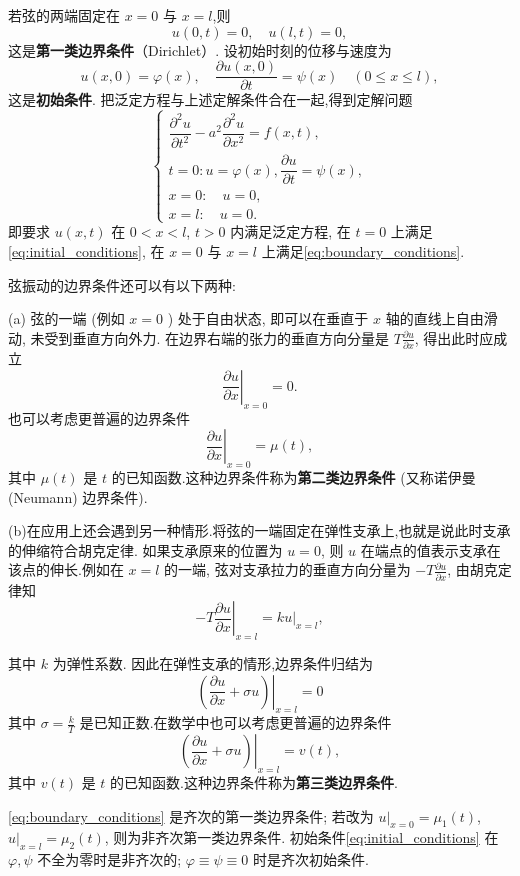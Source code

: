 若弦的两端固定在 $x=0$ 与 $x=l$,则
\begin{equation}
    u(0, t)=0, \quad u(l, t)=0,
    \label{eq:boundary_conditions}
\end{equation}
这是\textbf{第一类边界条件}（Dirichlet）.
设初始时刻的位移与速度为
\begin{equation}
    u(x, 0)=\varphi(x), \quad \frac{\partial u(x, 0)}{\partial t}=\psi(x) \quad(0 \leqslant x \leqslant l),
    \label{eq:initial_conditions}
\end{equation}
这是\textbf{初始条件}.
把泛定方程与上述定解条件合在一起,得到定解问题
$$
\left\{\begin{array}{l}
	\dfrac{\partial^2 u}{\partial t^2}-a^2 \dfrac{\partial^2 u}{\partial x^2}=f(x, t), \\
	t=0: u=\varphi(x), \dfrac{\partial u}{\partial t}=\psi(x), \\
	x=0: \quad u=0, \\
	x=l: \quad u=0 .
\end{array}\right.
$$
即要求 $u(x,t)$ 在 $0<x<l$, $t>0$ 内满足泛定方程,
在 $t=0$ 上满足\eqref{eq:initial_conditions},
在 $x=0$ 与 $x=l$ 上满足\eqref{eq:boundary_conditions}.

弦振动的边界条件还可以有以下两种:

(a) 弦的一端 (例如 $x=0$ ) 处于自由状态, 即可以在垂直于 $x$ 轴的直线上自由滑动, 未受到垂直方向外力.
在边界右端的张力的垂直方向分量是 $T \frac{\partial u}{\partial x}$, 得出此时应成立
$$
\left.\frac{\partial u}{\partial x}\right|_{x=0}=0 .
$$
也可以考虑更普遍的边界条件
$$
\left.\frac{\partial u}{\partial x}\right|_{x=0}=\mu(t) ,
$$
其中 $\mu(t)$ 是 $t$ 的已知函数.这种边界条件称为\textbf{第二类边界条件} (又称诺伊曼 (Neumann) 边界条件).

(b)在应用上还会遇到另一种情形.将弦的一端固定在弹性支承上,也就是说此时支承的伸缩符合胡克定律. 
如果支承原来的位置为 $u=0$, 则 $u$ 在端点的值表示支承在该点的伸长.例如在 $x=l$ 的一端, 
弦对支承拉力的垂直方向分量为 $-T \frac{\partial u}{\partial x}$, 由胡克定律知
$$
-\left.T \frac{\partial u}{\partial x}\right|_{x=l}=\left.k u\right|_{x=l},
$$

其中 $k$ 为弹性系数. 因此在弹性支承的情形,边界条件归结为
$$
\left.\left(\frac{\partial u}{\partial x}+\sigma u\right)\right|_{x=l}=0
$$
其中 $\sigma=\frac{k}{T}$ 是已知正数.在数学中也可以考虑更普遍的边界条件
$$
\left.\left(\frac{\partial u}{\partial x}+\sigma u\right)\right|_{x=l}=v(t),
$$
其中 $v(t)$ 是 $t$ 的已知函数.这种边界条件称为\textbf{第三类边界条件}.

\eqref{eq:boundary_conditions} 是齐次的第一类边界条件;
若改为 $u|_{x=0}=\mu_1(t)$, $u|_{x=l}=\mu_2(t)$, 则为非齐次第一类边界条件.
初始条件\eqref{eq:initial_conditions} 在 $\varphi,\psi$ 不全为零时是非齐次的;
$\varphi\equiv\psi\equiv 0$ 时是齐次初始条件.

